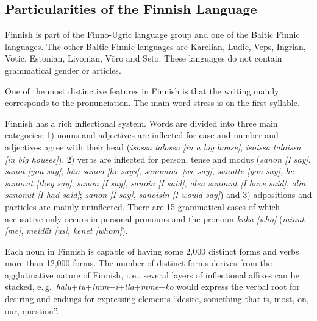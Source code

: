 \begin{multicols}{2}
\subsection{Particularities of the Finnish Language}

Finnish is part of the Finno-Ugric language group and one of the Baltic Finnic languages. The other Baltic Finnic languages are Karelian, Ludic, Veps, Ingrian, Votic, Estonian, Livonian, Võro and Seto. These languages do not contain grammatical gender or articles.

One of the most distinctive features in Finnish is that the writing mainly corresponds to the pronunciation. The main word stress is on the first syllable.

Finnish has a rich inflectional system. Words are divided into three main
categories: 1) nouns and adjectives are inflected for case and number and
adjectives agree with their head
(\textit{\foreignlanguage{finnish}{\textit{isossa talossa}} [in a big house]},
 \textit{\foreignlanguage{finnish}{\textit{isoissa taloissa}}
         [in big houses]}),
2) verbs are inflected for person, tense and modus
(\textit{\foreignlanguage{finnish}{\textit{sanon}} [I say]},
 \textit{\foreignlanguage{finnish}{\textit{sanot}} [you say]},
 \textit{\foreignlanguage{finnish}{\textit{hän sanoo}} [he says]},
 \textit{\foreignlanguage{finnish}{\textit{sanomme}} [we say]},
 \textit{\foreignlanguage{finnish}{\textit{sanotte}} [you say]},
 \textit{\foreignlanguage{finnish}{\textit{he sanovat}} [they say]};
 \textit{\foreignlanguage{finnish}{\textit{sanon}} [I say]},
 \textit{\foreignlanguage{finnish}{\textit{sanoin}} [I said]},
 \textit{\foreignlanguage{finnish}{\textit{olen sanonut}} [I have said]},
 \textit{\foreignlanguage{finnish}{\textit{olin sanonut}} [I had said]};
 \textit{\foreignlanguage{finnish}{\textit{sanon}} [I say]},
 \textit{\foreignlanguage{finnish}{\textit{sanoisin}} [I would say]})
 and 3) adpositions and particles are mainly uninflected. There are 15
grammatical cases of which accusative only occurs in personal pronouns and the
pronoun
\textit{\foreignlanguage{finnish}{\textit{kuka}} [who]} %
 (\textit{\foreignlanguage{finnish}{\textit{minut}} [me]},
  \textit{\foreignlanguage{finnish}{\textit{meidät}} [us]},
  \textit{\foreignlanguage{finnish}{\textit{kenet}} [whom]}).


  Each noun in Finnish is capable of having some 2,000 distinct forms and verbs more than 12,000 forms. The number of distinct forms derives from the agglutinative nature of Finnish, i.\,e., several layers of inflectional affixes can be stacked, e.\,g.~\textit{halu}+\textit{tu}+\textit{imm}+\textit{i}+\textit{lla}+\textit{mme}+\textit{ko} would express the verbal root for desiring and endings for expressing elements ``desire, something that is, most, on, our, question''.


\end{multicols}
